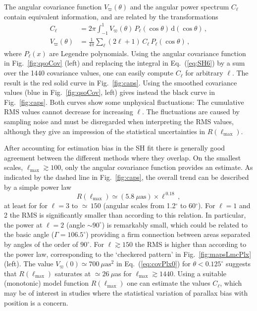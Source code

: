 \documentclass[longauth]{aa} %
\begin{document}
The angular covariance function $V_\varpi(\theta)$ and the angular power spectrum $C_\ell$
contain equivalent information, and are related by the transformations 
\begin{align}
C_\ell &= 2\pi \int_{-1}^1 V_\varpi(\theta)\,P_\ell(\cos\theta)\,\text{d}(\cos\theta)\, ,\label{eq:SH6}\\
V_\varpi(\theta) &= \frac{1}{4\pi}\sum_\ell (2\ell+1)\,C_\ell\,P_\ell(\cos\theta)\, ,\label{eq:SH7}
\end{align}
where $P_\ell(x)$ are Legendre polynomials. Using the angular covariance function in
Fig.~\ref{fig:qsoCov} (left) and replacing the integral in Eq.~(\ref{eq:SH6}) by a sum over the
1440 covariance values, one can easily compute $C_\ell$ for arbitrary $\ell$. The result
is the red solid curve in Fig.~\ref{fig:caps}. Using the smoothed covariance values (blue
in Fig.~\ref{fig:qsoCov}, left) gives instead the black curve in Fig.~\ref{fig:caps}. Both curves
show some unphysical fluctuations: The cumulative RMS values cannot decrease for increasing
$\ell$. The fluctuations are caused by sampling noise and must be disregarded when 
interpreting the RMS values, although they give an impression of the statistical uncertainties
in $R(\ell_\text{max})$.

After accounting for estimation bias in the SH fit there is generally good agreement between
the different methods where they overlap. On the smallest scales, $\ell_\text{max}\gtrsim 100$, 
only the angular covariance function provides an estimate. As indicated by the dashed line 
in Fig.~\ref{fig:caps}, the overall trend can be described by a simple power law 
\begin{equation}\label{eq:SH8}
R(\ell_\text{max}) \simeq (5.8~\mu\text{as})\times \ell^{\,0.18}\, ,
\end{equation}
at least for for $\ell=3$ to ${\simeq\,}150$ (angular scales from 1.2$^\circ$ to 60$^\circ$).
For $\ell=1$ and 2 the RMS is significantly smaller than according to this relation. In particular, 
the power at $\ell=2$ (angle $\sim 90^\circ$) is remarkably small, which could be related to
the basic angle ($\Gamma=106.5^\circ$) providing a firm connection between areas
separated by angles of the order of $90^\circ$. For $\ell \gtrsim 150$ the RMS is higher 
than according to the
power law, corresponding to the `checkered pattern' in Fig.~\ref{fig:mapsLmcPlx} (left).
The value $V_\varpi(0) \simeq 700~\mu\text{as}^2$ in Eq.~(\ref{eq:covPlx0}) for
$\theta<0.125^\circ$ suggests that $R(\ell_\text{max})$ saturates at $\simeq 26~\mu$as 
for $\ell_\text{max}\gtrsim 1440$. Using a suitable (monotonic) model function
$R(\ell_\text{max})$ one can estimate the values $C_\ell$, which may be of interest 
in studies where the statistical variation of parallax bias with position is a concern.
\end{document}
